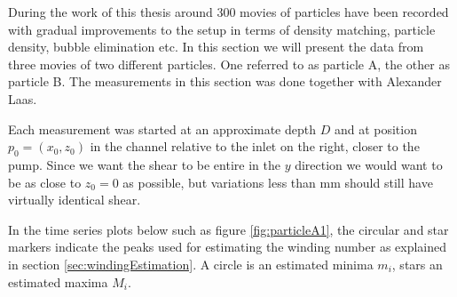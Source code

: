 During the work of this thesis around 300 movies of particles have been recorded with gradual improvements to the setup in terms of density matching, particle density, bubble elimination etc. In this section we will present the data from three movies of two different particles. One referred to as particle A, the other as particle B. The measurements in this section was done together with Alexander Laas.

Each measurement was started at an approximate depth $D$ and at position $p_0 = (x_0, z_0)$ in the channel relative to the inlet on the right, closer to the pump. Since we want the shear to be entire in the $y$ direction we would want to be as close to $z_0 = 0$ as possible, but variations less than \unit[1]{mm} should still have virtually identical shear.

In the time series plots below such as figure \ref{fig:particleA1}, the circular and star markers indicate the peaks used for estimating the winding number as explained in section \ref{sec:windingEstimation}. A circle is an estimated minima $m_i$, stars an estimated maxima $M_i$.

\newpage
